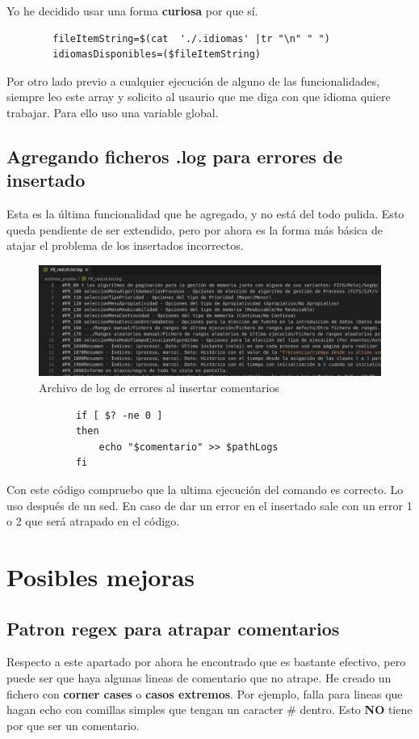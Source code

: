 \documentclass{article}
\begin{document}
        Yo he decidido usar una forma \textbf{curiosa} por que sí.
        \begin{verbatim}
        fileItemString=$(cat  './.idiomas' |tr "\n" " ")
        idiomasDisponibles=($fileItemString)
        \end{verbatim}

        Por otro lado previo a cualquier ejecución de alguno de las funcionalidades, siempre leo este array y solicito al usaurio que me diga con que idioma quiere trabajar. Para ello uso una variable global.
    
    \subsection{Agregando ficheros .log para errores de insertado}
        Esta es la última funcionalidad que he agregado, y no está del todo pulida. Esto queda pendiente de ser extendido, pero por ahora es la forma más básica de atajar el problema de los insertados incorrectos.


        \begin{figure}
            \centering
            \includegraphics[width=0.75\linewidth]{_log.png}
            \caption{Archivo de log de errores al insertar comentarios}
        \end{figure}
    
        \begin{verbatim}
            if [ $? -ne 0 ]
            then
                echo "$comentario" >> $pathLogs
            fi
        \end{verbatim}

        Con este código compruebo que la ultima ejecución del comando es correcto. Lo uso después de un sed. En caso de dar un error en el insertado sale con un error 1 o 2 que será atrapado en el código.

\section{Posibles mejoras}
    \subsection{Patron regex para atrapar comentarios}
        Respecto a este apartado por ahora he encontrado que es bastante efectivo, pero puede ser que haya algunas lineas de comentario que no atrape. He creado un fichero con \textbf{corner cases} o \textbf{casos extremos}. Por ejemplo, falla para lineas que hagan echo con comillas simples que tengan un caracter \# dentro. Esto \textbf{NO} tiene por que ser un comentario.
    
\end{document}
